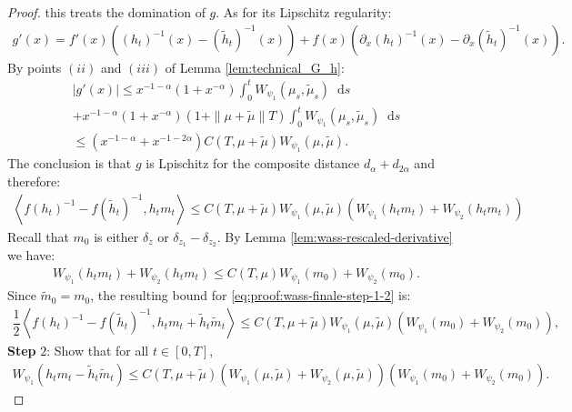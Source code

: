 \documentclass[11pt,a4paper]{article}
\newcommand{\brac}[1]{\left\langle#1\right\rangle}
\newcommand{\dd}{\mathop{}\!\mathrm{d}}
\begin{document}
\begin{proof}
    this treats the domination of $g$. As for its Lipschitz regularity:
    \begin{align*}
        g'(x) = f'(x) \left((h_t)^{-1}(x) - (\tilde{h}_t)^{-1}(x)\right) + f(x) \left(\partial_x(h_t)^{-1}(x) - \partial_x(\tilde{h}_t)^{-1}(x)\right).
    \end{align*}
    By points $(ii)$ and $(iii)$ of Lemma \ref{lem:technical_G_h}:
    \begin{multline*}
        \left| g'(x) \right| \leq x^{-1-\alpha} \left(1 + x^{-\alpha} \right) \int_0^t W_{\psi_1}(\mu_s,\tilde{\mu}_s) \dd s \\
        +
        x^{-1-\alpha} \left(1 + x^{-\alpha} \right) \left(1 + \|\mu + \tilde{\mu}\|T\right) \int_0^t W_{\psi_1}(\mu_s,\tilde{\mu}_s) \dd s \\
        \leq \left(x^{-1-\alpha} + x^{-1-2\alpha}\right)C(T,\mu + \tilde{\mu}) W_{\psi_1}(\mu,\tilde{\mu}).
    \end{multline*}
    The conclusion is that $g$ is Lpischitz for the composite distance $d_{\alpha} + d_{2\alpha}$ and therefore:
    \begin{align*}
        \brac{f(h_t)^{-1} - f(\tilde{h}_t)^{-1},h_t m_t } \leq C(T,\mu + \tilde{\mu})W_{\psi_1}(\mu,\tilde{\mu})\left( W_{\psi_1}\left(h_t m_t\right) + W_{\psi_2}\left(h_t m_t\right)\right)
    \end{align*}
    Recall that $m_0$ is either $\delta_z$ or $\delta_{z_1}-\delta_{z_2}$. By Lemma \ref{lem:wass-rescaled-derivative} we have:
    \begin{align*}
        W_{\psi_1}\left(h_t m_t\right) + W_{\psi_2}\left(h_t m_t\right) \leq C(T,\mu) W_{\psi_1}\left(m_0\right) + W_{\psi_2}\left(m_0\right).
    \end{align*}
    Since $\tilde{m}_0 = m_0$, the resulting bound for \eqref{eq:proof:wass-finale-step-1-2} is:
    \begin{align*}
        \dfrac12\brac{f(h_t)^{-1} - f(\tilde{h}_t)^{-1},h_t m_t + \tilde{h}_t\tilde{m}_t}  \leq C(T,\mu + \tilde{\mu})W_{\psi_1}(\mu,\tilde{\mu})\left( W_{\psi_1}\left(m_0\right) + W_{\psi_2}\left(m_0\right)\right),
    \end{align*}
    \textbf{Step} $2$: Show that for all $t \in [0,T]$, 
    \begin{align*}
        W_{\psi_1}(h_tm_t - \tilde{h}_t\tilde{m}_t) \leq C(T,\mu + \tilde{\mu})\left(W_{\psi_1}\left( \mu , \tilde{\mu}\right) + W_{\psi_2}\left( \mu , \tilde{\mu}\right)\right)\left(W_{\psi_1}(m_0) + W_{\psi_2}(m_0) \right).
    \end{align*}
    

\end{proof}
\end{document}
